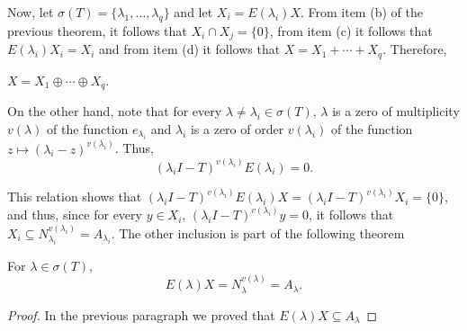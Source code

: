Now, let $\sigma(T) = \{\lambda_1,\ldots, \lambda_q\}$ and let $X_i = E(\lambda_i) X$. From item (b) of the previous theorem, it follows that $X_i\cap X_j = \{0\}$, from item (c) it follows that $E(\lambda_i) X_i = X_i$ and from item (d) it follows that $X = X_1+\cdots + X_q$. Therefore,

\begin{corollary}
    $X = X_1 \oplus \cdots \oplus X_q $.
\end{corollary}

On the other hand, note that for every $\lambda \neq \lambda_i \in \sigma(T)$, $\lambda$ is a zero of multiplicity $v(\lambda)$ of the function $e_{\lambda_i}$ and $\lambda_i$ is a zero of order $v(\lambda_i)$ of the function $z \mapsto (\lambda_i - z)^{v(\lambda_i)}$. Thus,
\[ (\lambda_i I - T)^{v(\lambda_i)} E(\lambda_i) = 0. \]

This relation shows that $(\lambda_i I - T)^{v(\lambda_i)} E(\lambda_i)X = (\lambda_i I - T)^{v(\lambda_i)} X_i = \{0\}$, and thus, since for every $y \in X_i$, $(\lambda_i I - T)^{v(\lambda_i)} y = 0$, it follows that $X_i \subseteq N_{\lambda_i}^{v(\lambda_i)} = A_{\lambda_i}$. The other inclusion is part of the following theorem

\begin{theorem}
    For $\lambda \in \sigma(T)$,
    \[ E(\lambda)X = N_\lambda^{v(\lambda)} = A_\lambda. \]
\end{theorem}

\begin{proof}
    In the previous paragraph we proved that $E(\lambda)X \subseteq A_{\lambda}$
\end{proof}